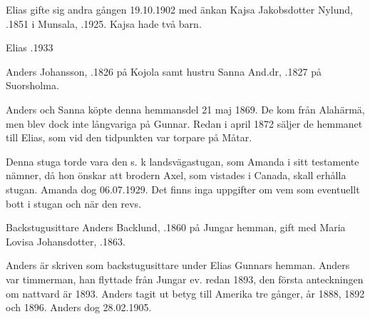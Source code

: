 Elias gifte sig andra gången 19.10.1902 med änkan Kajsa Jakobsdotter Nylund, .1851 i Munsala, .1925. Kajsa hade två barn.
\begin{jhchildren}
  \item {}
  \item {}
\end{jhchildren}
Elias .1933


Anders Johansson, .1826 på Kojola samt hustru Sanna And.dr, .1827 på Suorsholma.
\begin{jhchildren}
  \item {}
  \item {}
  \item {}
\end{jhchildren}
Anders och Sanna köpte denna hemmansdel 21 maj 1869. De kom från Alahärmä, men blev dock inte långvariga på Gunnar. Redan i april 1872 säljer de hemmanet till Elias, som vid den tidpunkten var torpare på Måtar.




Denna stuga torde vara den s. k landsvägastugan, som Amanda i sitt testamente nämner, då hon önskar att brodern Axel, som vistades i Canada, skall erhålla stugan. Amanda dog 06.07.1929. Det finns inga uppgifter om vem som eventuellt bott i stugan och när den revs.


Backstugusittare Anders Backlund, .1860 på Jungar hemman, gift med Maria Lovisa Johansdotter, .1863.
\begin{jhchildren}
  \item {}
  \item {}
  \item {}
  \item {}
  \item {}
\end{jhchildren}
Anders är skriven som backstugusittare under Elias Gunnars hemman. Anders var timmerman, han flyttade från Jungar ev. redan 1893, den första anteckningen om nattvard är 1893. Anders tagit ut betyg till Amerika tre gånger, år 1888, 1892 och 1896. Anders dog 28.02.1905.

